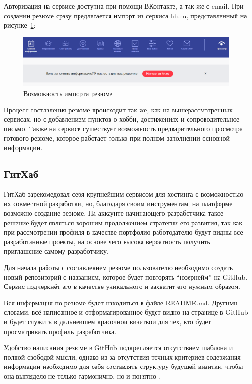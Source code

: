 \documentclass[master, och, pract]{SCWorks}
\begin{document}
Авторизация на сервисе доступна при помощи ВКонтакте, а так же с email.
При создании резюме сразу предлагается импорт из сервиса hh.ru, представленный 
на рисунке~\ref{fig:13}:
\begin{figure}[!ht]
    \centering
    \includegraphics[width=12cm]{images/image13.png}
    \caption{\label{fig:13}%
        Возможность импорта резюме}
\end{figure}

Процесс составления резюме происходит так же, как на вышерассмотренных сервисах, 
но с добавлением пунктов о хобби, достижениях и сопроводительное письмо. 
Также на сервисе существует возможность предварительного просмотра готового резюме, 
которое работает только при полном заполнении основной информации.

\subsection{ГитХаб}
ГитХаб зарекомедовал себя крупнейшим сервисом для хостинга с возможностью их совместной 
разработки, но, благодаря своим инструментам, на платформе возможно создание резюме. 
На аккаунте начинающего разработчика такое решение будет являться хорошим продолжением 
стратегии его развития, так как при рассмотрении профиля в качестве портфолио работодателю 
будут видны все разработанные проекты, на основе чего высока вероятность получить 
приглашение самому разработчику.

Для начала работы с составлением резюме пользователю необходимо создать новый репозиторий 
с названием, которое будет повторять “юзернейм” на GitHub. Сервис подчеркнёт его в качестве 
уникального и захватит его нужным образом.

Вся информация по резюме будет находиться в файле README.md. Другими словами, 
всё написанное и отформатированное будет видно на странице в GitHub и будет служить 
в дальнейшем красочной визиткой для тех, кто будет просматривать профиль разработчика. 

Удобство написания резюме в GitHub подкрепляется отсутствием шаблона и полной свободой мысли, 
однако из-за отсутствия точных критериев содержания информации необходимо для себя составлять 
структуру будущей визитки, чтобы она выглядело не только гармонично, 
но и понятно \cite{lienhart_maydt_2002}.
\end{document}
